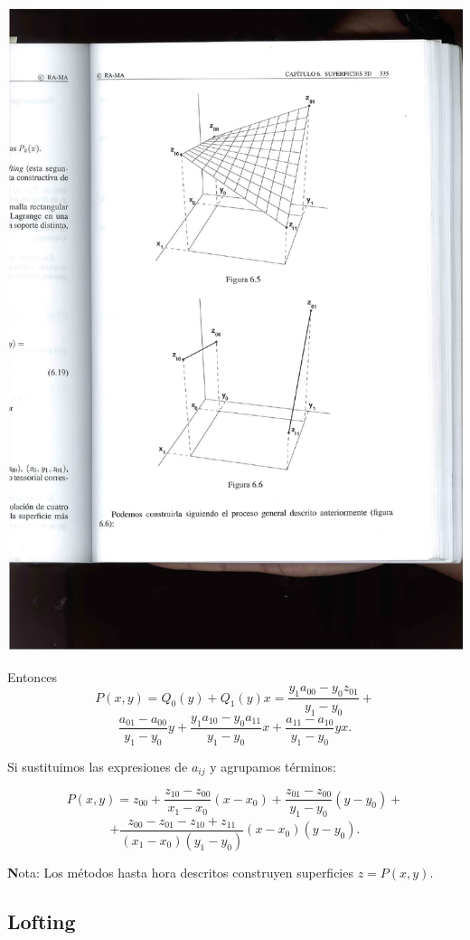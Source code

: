 \documentclass[ebook,oneside]{memoir}
\begin{document}
\begin{center}
\includegraphics[scale=0.45]{6_5.pdf}
\end{center}

Entonces
$$P(x,y)=Q_0(y)+Q_1(y)x=\frac{y_1 a_{00}-y_0 z_{01}}{y_1-y_0}+$$
$$\frac{a_{01}-a_{00}}{y_1-y_0}y+\frac{y_1 a_{10}-y_0 a_{11}}{y_1-y_0}x+\frac{a_{11}-a_{10}}{y_1-y_0}yx.$$

Si sustituimos las expresiones de $a_{ij}$ y agrupamos t\'{e}rminos:

$$P(x,y)=z_{00}+\frac{z_{10}- z_{00}}{x_1-x_0}(x-x_0)+\frac{z_{01}-z_{00}}{y_1-y_0}(y-y_0)+$$
$$+\frac{z_{00}-z_{01}-z_{10}+z_{11}}{(x_1-x_0)(y_1-y_0)}(x-x_0)(y-y_0).$$

{\textbf Nota:} Los m\'{e}todos hasta hora descritos construyen superficies $z=P(x,y).$

\subsection{Lofting}
\end{document}
